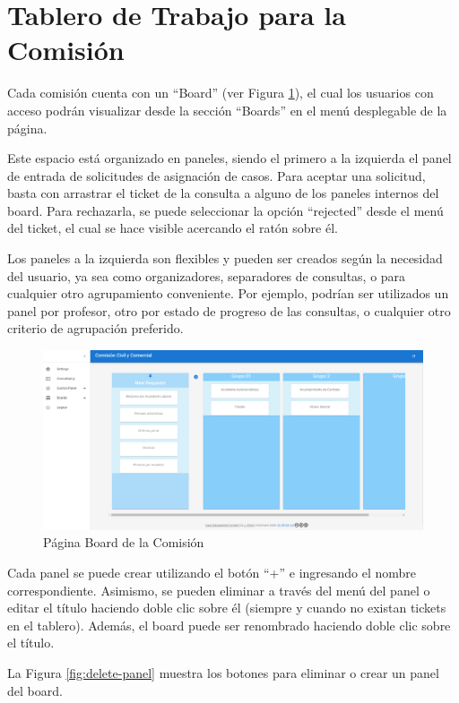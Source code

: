 \section{Tablero de Trabajo para la Comisión}
Cada comisión cuenta con un ``Board'' (ver Figura \ref{fig:board-real-page}), el cual los usuarios con acceso podrán visualizar desde la sección ``Boards'' en el menú desplegable de la página.

Este espacio está organizado en paneles, siendo el primero a la izquierda el panel de entrada de solicitudes de asignación de casos. Para aceptar una solicitud, basta con arrastrar el ticket de la consulta a alguno de los paneles internos del board. Para rechazarla, se puede seleccionar la opción ``rejected'' desde el menú del ticket, el cual se hace visible acercando el ratón sobre él.

Los paneles a la izquierda son flexibles y pueden ser creados según la necesidad del usuario, ya sea como organizadores, separadores de consultas, o para cualquier otro agrupamiento conveniente. Por ejemplo, podrían ser utilizados un panel por profesor, otro por estado de progreso de las consultas, o cualquier otro criterio de agrupación preferido.

\begin{figure}[H]
    \centering
    \includegraphics[width=1\linewidth]{fig/board-real-page.png}
    \caption{Página Board de la Comisión}
    \label{fig:board-real-page}
\end{figure}

Cada panel se puede crear utilizando el botón ``+'' e ingresando el nombre correspondiente. Asimismo, se pueden eliminar a través del menú del panel o editar el título haciendo doble clic sobre él (siempre y cuando no existan tickets en el tablero). Además, el board puede ser renombrado haciendo doble clic sobre el título.

La Figura \ref{fig:delete-panel} muestra los botones para eliminar o crear un panel del board.


